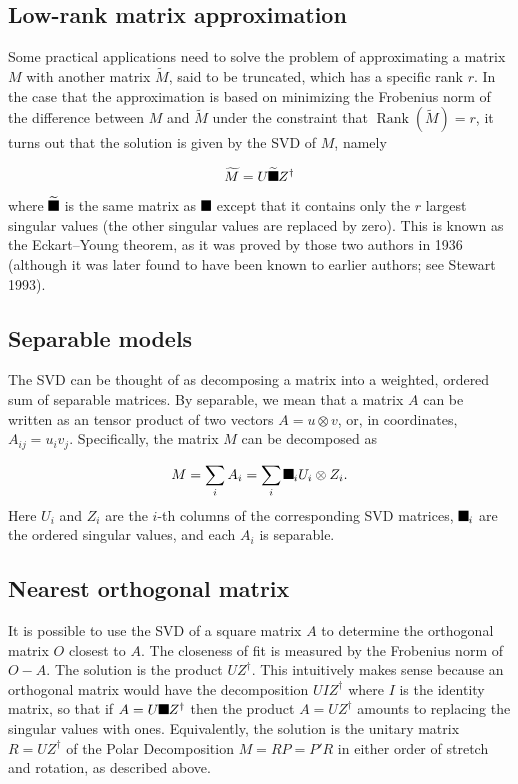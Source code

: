 \documentclass[aps,preprint]{revtex4}%
\providecommand{\U}[1]{\protect\rule{.1in}{.1in}}
\begin{document}
\subsection{Low-rank matrix approximation}

Some practical applications need to solve the problem of approximating a
matrix $M$ with another matrix $\widetilde{M}$, said to be truncated, which
has a specific rank $r$. In the case that the approximation is based on
minimizing the Frobenius norm of the difference between $M$ and $\widetilde{M}%
$ under the constraint that $\operatorname*{Rank}(\widetilde{M})=r$, it turns
out that the solution is given by the SVD of $M$, namely%

\begin{equation}
\widetilde{M}=U\widetilde{\U{3a3} }Z^{\dagger}%
\end{equation}
where $\widetilde{\U{3a3} }$ is the same matrix as $\U{3a3} $ except that it
contains only the $r$ largest singular values (the other singular values are
replaced by zero). This is known as the Eckart--Young theorem, as it was
proved by those two authors in 1936 (although it was later found to have been
known to earlier authors; see Stewart 1993).

\subsection{Separable models}

The SVD can be thought of as decomposing a matrix into a weighted, ordered sum
of separable matrices. By separable, we mean that a matrix $A$ can be written
as an tensor product of two vectors $A=u\otimes v$, or, in coordinates,
$A_{ij}=u_{i}v_{j}$. Specifically, the matrix $M$ can be decomposed as%

\begin{equation}
M=\sum_{i}A_{i}=\sum_{i}\U{3c3} _{i}U_{i}\otimes Z_{i}.
\end{equation}
Here $U_{i}$ and $Z_{i}$ are the $i$-th columns of the corresponding SVD
matrices, $\U{3c3} _{i}$ are the ordered singular values, and each $A_{i}$ is separable.

\subsection{Nearest orthogonal matrix}

It is possible to use the SVD of a square matrix $A$ to determine the
orthogonal matrix $O$ closest to $A$. The closeness of fit is measured by the
Frobenius norm of $O-A.$ The solution is the product $UZ^{\dagger}$. This
intuitively makes sense because an orthogonal matrix would have the
decomposition $UIZ^{\dagger}$ where $I$ is the identity matrix, so that if
$A=U\U{3a3} Z^{\dagger}$ then the product $A=UZ^{\dagger}$ amounts to
replacing the singular values with ones. Equivalently, the solution is the
unitary matrix $R=UZ^{\dagger}$ of the Polar Decomposition $M=RP=P\prime R$ in
either order of stretch and rotation, as described above.
\end{document}
